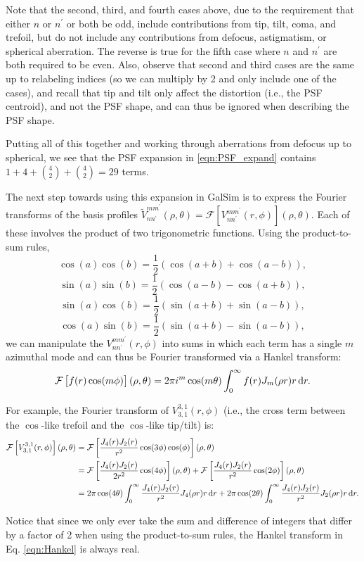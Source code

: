 \documentclass{article}
\begin{document}
Note that the second, third, and fourth cases above, due to the requirement that either $n$ or $n^\prime$ or both be odd, include contributions from tip, tilt, coma, and trefoil, but do not include any contributions from defocus, astigmatism, or spherical aberration.
The reverse is true for the fifth case where $n$ and $n^\prime$ are both required to be even.
Also, observe that second and third cases are the same up to relabeling indices (so we can multiply by 2 and only include one of the cases), and recall that tip and tilt only affect the distortion (i.e., the PSF centroid), and not the PSF shape, and can thus be ignored when describing the PSF shape.

Putting all of this together and working through aberrations from defocus up to spherical, we see that the PSF expansion in \ref{eqn:PSF_expand} contains $1 + 4 + \binom{4}{2} + \binom{4}{2} = 29$ terms.

The next step towards using this expansion in GalSim is to express the Fourier transforms of the basis profiles $\widetilde{V}_{n n^\prime}^{m m^\prime}(\rho, \theta) = \mathcal{F} \left[V_{n n^\prime}^{m m^\prime}(r, \phi)\right] (\rho, \theta)$.
Each of these involves the product of two trigonometric functions.
Using the product-to-sum rules,
\begin{equation}
  \cos(a) \cos(b) = \frac{1}{2}\left(\cos(a+b) + \cos(a-b)\right),
\end{equation}
\begin{equation}
  \sin(a) \sin(b) = \frac{1}{2}\left(\cos(a-b) - \cos(a+b)\right),
\end{equation}
\begin{equation}
  \sin(a) \cos(b) = \frac{1}{2}\left(\sin(a+b) + \sin(a-b)\right),
\end{equation}
\begin{equation}
  \cos(a) \sin(b) = \frac{1}{2}\left(\sin(a+b) - \sin(a-b)\right),
\end{equation}
we can manipulate the $V_{n n^\prime}^{m m^\prime}(r, \phi)$ into sums in which each term has a single $m$ azimuthal mode and can thus be Fourier transformed via a Hankel transform:
\begin{equation}
  \label{eqn:Hankel}
  \mathcal{F} \left[f(r) \cos(m \phi) \right](\rho, \theta) = 2 \pi i^m \cos(m \theta) \int_0^\infty f(r) J_m(\rho r) r \dif{r}.
\end{equation}

For example, the Fourier transform of $V_{3,1}^{3,1}(r, \phi)$ (i.e., the cross term between the $\cos$-like trefoil and the $\cos$-like tip/tilt) is:
\begin{align}
  \mathcal{F} \left[V_{3,1}^{3,1}(r, \phi)\right](\rho, \theta) &= \mathcal{F} \left[\frac{J_4(r) J_2(r)}{r^2} \cos(3 \phi) \cos(\phi)\right](\rho, \theta) \\
  &= \mathcal{F} \left[\frac{J_4(r) J_2(r)}{2 r^2} \cos(4 \phi)\right](\rho, \theta) + \mathcal{F} \left[\frac{J_4(r) J_2(r)}{r^2} \cos(2 \phi)\right](\rho, \theta) \\
  &= 2 \pi \cos(4 \theta) \int_0^\infty \frac{J_4(r) J_2(r)}{r^2} J_4(\rho r) r \dif{r} + 2 \pi \cos(2 \theta) \int_0^\infty \frac{J_4(r) J_2(r)}{r^2} J_2(\rho r) r \dif{r}.
\end{align}

Notice that since we only ever take the sum and difference of integers that differ by a factor of 2 when using the product-to-sum rules, the Hankel transform in Eq. \ref{eqn:Hankel} is always real.
\end{document}
